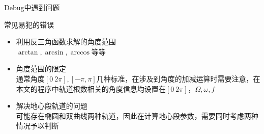 \documentclass[11pt]{ctexbeamer}
\begin{document}
\begin{frame}{Debug中遇到问题}
	\begin{block}{常见易犯的错误}
		\begin{itemize}
			\item 利用反三角函数求解的角度范围\\
			$ \arctan,\arcsin,\arccos $等等
			\item 角度范围的限定\\
			通常角度$[0~2\pi],[-\pi,\pi]$几种标准，在涉及到角度的加减运算时需要注意，在本文的程序中轨道根数相关的角度信息均设置在$[0~2\pi]$，$ \Omega,\omega,f $
			\item 解决地心段轨道的问题\\
			可能存在椭圆和双曲线两种轨道，因此在计算地心段参数，需要同时考虑两种情况予以判断
		\end{itemize}
	\end{block}
\end{frame}
\end{document}
